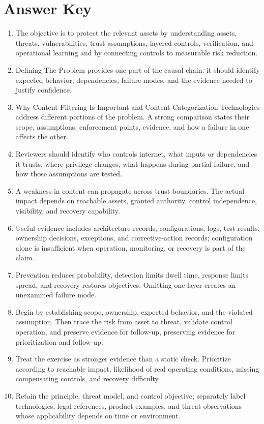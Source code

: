 \documentclass[11pt]{article}
\begin{document}
\section*{Answer Key}
\begin{enumerate}
\item The objective is to protect the relevant assets by understanding assets, threats, vulnerabilities, trust assumptions, layered controls, verification, and operational learning and by connecting controls to measurable risk reduction.
\item Defining The Problem provides one part of the causal chain: it should identify expected behavior, dependencies, failure modes, and the evidence needed to justify confidence.
\item Why Content Filtering Is Important and Content Categorization Technologies address different portions of the problem. A strong comparison states their scope, assumptions, enforcement points, evidence, and how a failure in one affects the other.
\item Reviewers should identify who controls internet, what inputs or dependencies it trusts, where privilege changes, what happens during partial failure, and how those assumptions are tested.
\item A weakness in content can propagate across trust boundaries. The actual impact depends on reachable assets, granted authority, control independence, visibility, and recovery capability.
\item Useful evidence includes architecture records, configurations, logs, test results, ownership decisions, exceptions, and corrective-action records; configuration alone is insufficient when operation, monitoring, or recovery is part of the claim.
\item Prevention reduces probability, detection limits dwell time, response limits spread, and recovery restores objectives. Omitting one layer creates an unexamined failure mode.
\item Begin by establishing scope, ownership, expected behavior, and the violated assumption. Then trace the risk from asset to threat, validate control operation, and preserve evidence for follow-up, preserving evidence for prioritization and follow-up.
\item Treat the exercise as stronger evidence than a static check. Prioritize according to reachable impact, likelihood of real operating conditions, missing compensating controls, and recovery difficulty.
\item Retain the principle, threat model, and control objective; separately label technologies, legal references, product examples, and threat observations whose applicability depends on time or environment.
\end{enumerate}
\end{document}

